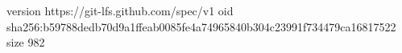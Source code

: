 version https://git-lfs.github.com/spec/v1
oid sha256:b59788dedb70d9a1ffeab0085fe4a74965840b304c23991f734479ca16817522
size 982
